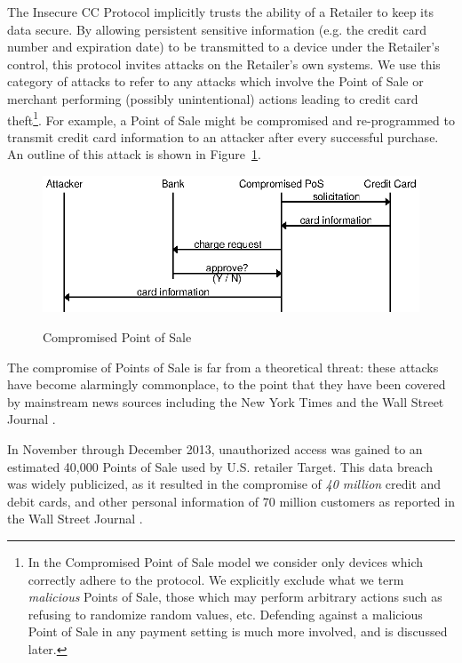 The Insecure CC Protocol implicitly trusts the ability of a Retailer to keep its data secure.
By allowing persistent sensitive information (e.g. the credit card number and expiration date) to be transmitted to a device under the Retailer's control,
  this protocol invites attacks on the Retailer's own systems.
We use this category of attacks to refer to any attacks which involve the Point of Sale or merchant performing (possibly unintentional) actions leading to credit card theft\footnote{
	In the Compromised Point of Sale model we consider only devices which correctly adhere to the protocol.
	We explicitly exclude what we term \emph{malicious} Points of Sale, those which may perform arbitrary actions such as refusing to randomize random values, etc.
	Defending against a malicious Point of Sale in any payment setting is much more involved, and is discussed later.
}.
For example, a Point of Sale might be compromised and re-programmed to transmit credit card information to an attacker after every successful purchase.
An outline of this attack is shown in Figure~\ref{fig:insecure-compromised}.

\begin{figure}[h!]
  \caption{Compromised Point of Sale}
  \centering
    \includegraphics{img/attack-3-comppos.eps}
  \label{fig:insecure-compromised}
\end{figure}

The compromise of Points of Sale is far from a theoretical threat:
these attacks have become alarmingly commonplace, to the point that they have been covered by mainstream news sources including the New York Times \cite{neimanmarcushack} and the Wall Street Journal \cite{targethack}\cite{homedepothack}.

In November through December 2013, unauthorized access was gained to an estimated 40,000 Points of Sale used by U.S. retailer Target.
This data breach was widely publicized, as it resulted in the compromise of \emph{40 million} credit and debit cards, and other personal information of 70 million customers as reported in the Wall Street Journal \cite{targethack}.

